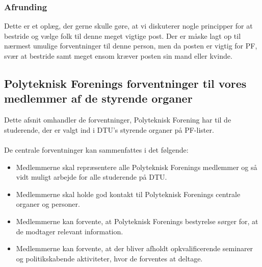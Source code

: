 \subsubsection{Afrunding}
Dette er et oplæg, der gerne skulle gøre, at vi diskuterer nogle principper for at bestride og vælge folk til denne meget vigtige post. Der er måske lagt op til nærmest umulige forventninger til denne person, men da posten er vigtig for PF, svær at bestride samt meget ensom kræver posten sin mand eller kvinde.

\subsection{Polyteknisk Forenings forventninger til vores medlemmer af de styrende organer}
Dette afsnit omhandler de forventninger, Polyteknisk Forening har til de studerende, der er valgt ind i DTU’s styrende organer på PF-lister.\\
\\
De centrale forventninger kan sammenfattes i det følgende:
\begin{itemize}
\item Medlemmerne skal repræsentere alle Polyteknisk Forenings medlemmer og så vidt muligt arbejde
for alle studerende på DTU.
\item Medlemmerne skal holde god kontakt til Polyteknisk Forenings centrale organer og personer.
\item Medlemmerne kan forvente, at Polyteknisk Forenings bestyrelse sørger for, at de modtager relevant information.
\item Medlemmerne kan forvente, at der bliver afholdt opkvalificerende seminarer og politikskabende
aktiviteter, hvor de forventes at deltage.
\end{itemize}

